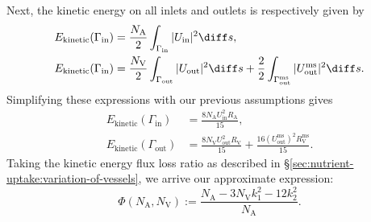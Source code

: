     Next, the kinetic energy on all inlets and outlets is respectively given by
    \begin{align*}
        E_\text{kinetic}(\Gamma_\text{in}) & = \frac{N_\text{A}}{2} \int_{\Gamma_\text{in}} |U_\text{in}|^2 \diff s, \\
        E_\text{kinetic}(\Gamma_\text{in}) & = \frac{N_\text{V}}{2} \int_{\Gamma_\text{out}} |U_\text{out}|^2 \diff s + \frac{2}{2} \int_{\Gamma^\text{ms}_\text{out}} |U^\text{ms}_\text{out}|^2 \diff s.
    \end{align*}
    Simplifying these expressions with our previous assumptions gives
    \begin{align}
        E_\text{kinetic}(\Gamma_\text{in}) & = \frac{8 N_\text{A} U_\text{in}^2 R_\text{A}}{15}, \\
        E_\text{kinetic}(\Gamma_\text{out}) & = \frac{8 N_\text{V} U_\text{out}^2 R_\text{V}}{15} + \frac{16 (U^\text{ms}_\text{out})^2 R^\text{ms}_\text{V}}{15}.
    \end{align}
    Taking the kinetic energy flux loss ratio as described in \S\ref{sec:nutrient-uptake:variation-of-vessels}, we arrive our approximate expression:
    \begin{equation}
        \Phi(N_\text{A}, N_\text{V}) := \frac{N_\text{A} - 3N_\text{V}k_1^2 - 12k_2^2}{N_\text{A}}.
    \end{equation}